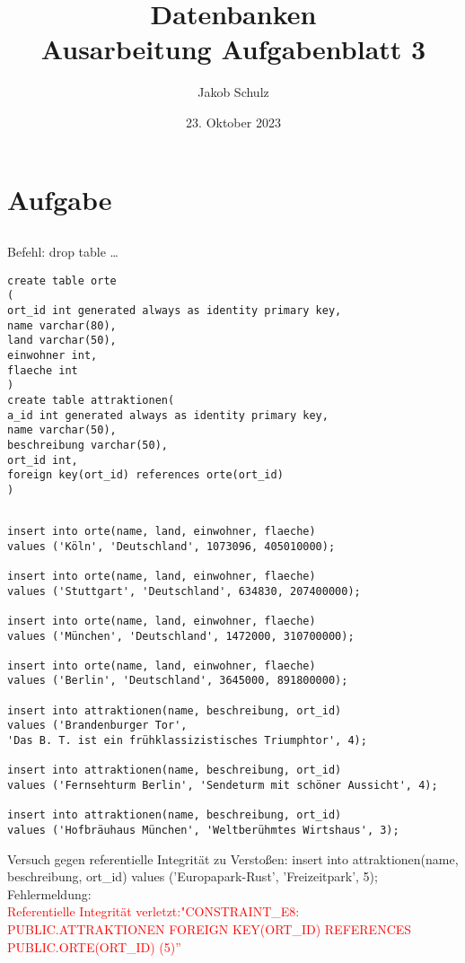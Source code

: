 \documentclass[a4paper,11pt,titlepage]{article}
\begin{document}
\title{Datenbanken\\
Ausarbeitung Aufgabenblatt 3}


\author{Jakob Schulz}


\date{23. Oktober 2023}

\maketitle{\thispagestyle{plain}}

\section{Aufgabe}
\subsection{}
Befehl: drop table \dots
\begin{verbatim}
create table orte 
(
ort_id int generated always as identity primary key,
name varchar(80),
land varchar(50),
einwohner int,
flaeche int
)
create table attraktionen(
a_id int generated always as identity primary key,
name varchar(50),
beschreibung varchar(50),
ort_id int,
foreign key(ort_id) references orte(ort_id)
)
\end{verbatim}
\subsection{}
\begin{verbatim}
insert into orte(name, land, einwohner, flaeche) 
values ('Köln', 'Deutschland', 1073096, 405010000);

insert into orte(name, land, einwohner, flaeche) 
values ('Stuttgart', 'Deutschland', 634830, 207400000);

insert into orte(name, land, einwohner, flaeche)
values ('München', 'Deutschland', 1472000, 310700000);

insert into orte(name, land, einwohner, flaeche) 
values ('Berlin', 'Deutschland', 3645000, 891800000);
		
insert into attraktionen(name, beschreibung, ort_id) 
values ('Brandenburger Tor', 
'Das B. T. ist ein frühklassizistisches Triumphtor', 4);

insert into attraktionen(name, beschreibung, ort_id) 
values ('Fernsehturm Berlin', 'Sendeturm mit schöner Aussicht', 4);

insert into attraktionen(name, beschreibung, ort_id)
values ('Hofbräuhaus München', 'Weltberühmtes Wirtshaus', 3);
\end{verbatim}
Versuch gegen referentielle Integrität zu Verstoßen: insert into attraktionen(name, beschreibung, ort\_id) values ('Europapark-Rust', 'Freizeitpark', 5);\\
Fehlermeldung: \\
 \textcolor{red}{Referentielle Integrität verletzt:"CONSTRAINT\_E8: PUBLIC.ATTRAKTIONEN FOREIGN KEY(ORT\_ID) REFERENCES PUBLIC.ORTE(ORT\_ID) (5)''}
\end{document}
